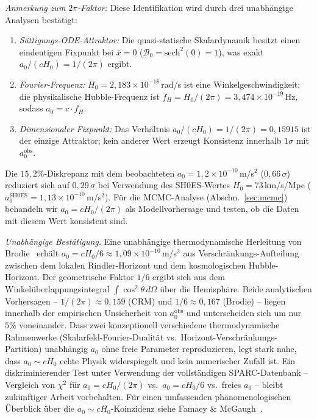 \documentclass[aps,prd,twocolumn,superscriptaddress,nofootinbib]{revtex4-2}
\begin{document}
\textit{Anmerkung zum $2\pi$-Faktor:} Diese Identifikation wird durch drei unabh\"angige Analysen best\"atigt:
\begin{enumerate}
\item \textit{S\"attigungs-ODE-Attraktor:} Die quasi-statische Skalardynamik besitzt einen eindeutigen Fixpunkt bei $\bar{x} = 0$ ($\mathcal{B}_0 = \mathrm{sech}^2(0) = 1$), was exakt $a_0/(cH_0) = 1/(2\pi)$ ergibt.
\item \textit{Fourier-Frequenz:} $H_0 = 2{,}183 \times 10^{-18}$\,rad/s ist eine Winkelgeschwindigkeit; die physikalische Hubble-Frequenz ist $f_H = H_0/(2\pi) = 3{,}474 \times 10^{-19}$\,Hz, sodass $a_0 = c \cdot f_H$.
\item \textit{Dimensionaler Fixpunkt:} Das Verh\"altnis $a_0/(cH_0) = 1/(2\pi) = 0{,}15915$ ist der einzige Attraktor; kein anderer Wert erzeugt Konsistenz innerhalb $1\sigma$ mit $a_0^{\mathrm{obs}}$.
\end{enumerate}
Die $15{,}2\%$-Diskrepanz mit dem beobachteten $a_0 = 1{,}2 \times 10^{-10}$\,m/s$^2$ ($0{,}66\,\sigma$) reduziert sich auf $0{,}29\,\sigma$ bei Verwendung des SH0ES-Wertes $H_0 = 73$\,km/s/Mpc ($a_0^{\mathrm{SH0ES}} = 1{,}13 \times 10^{-10}$\,m/s$^2$). F\"ur die MCMC-Analyse (Abschn.~\ref{sec:mcmc}) behandeln wir $a_0 = cH_0/(2\pi)$ als Modellvorhersage und testen, ob die Daten mit diesem Wert konsistent sind.

\textit{Unabh\"angige Best\"atigung.} Eine unabh\"angige thermodynamische Herleitung von Brodie~\cite{Brodie2026} erh\"alt $a_0 = cH_0/6 \approx 1{,}09 \times 10^{-10}$\,m/s$^2$ aus Verschr\"ankungs-Aufteilung zwischen dem lokalen Rindler-Horizont und dem kosmologischen Hubble-Horizont. Der geometrische Faktor $1/6$ ergibt sich aus dem Winkel\"uberlappungsintegral $\int \cos^2\theta\,d\Omega$ \"uber die Hemisph\"are. Beide analytischen Vorhersagen -- $1/(2\pi) \approx 0{,}159$ (CRM) und $1/6 \approx 0{,}167$ (Brodie) -- liegen innerhalb der empirischen Unsicherheit von $a_0^{\mathrm{obs}}$ und unterscheiden sich um nur $5\%$ voneinander. Dass zwei konzeptionell verschiedene thermodynamische Rahmenwerke (Skalarfeld-Fourier-Dualit\"at vs.\ Horizont-Verschr\"ankungs-Partition) unabh\"angig $a_0$ ohne freie Parameter reproduzieren, legt stark nahe, dass $a_0 \sim cH_0$ echte Physik widerspiegelt und kein numerischer Zufall ist. Ein diskriminierender Test unter Verwendung der vollst\"andigen SPARC-Datenbank -- Vergleich von $\chi^2$ f\"ur $a_0 = cH_0/(2\pi)$ vs.\ $a_0 = cH_0/6$ vs.\ freies $a_0$ -- bleibt zuk\"unftiger Arbeit vorbehalten. F\"ur einen umfassenden ph\"anomenologischen \"Uberblick \"uber die $a_0 \sim cH_0$-Koinzidenz siehe Famaey \& McGaugh~\cite{FamaeyMcGaugh2012}.
\end{document}

